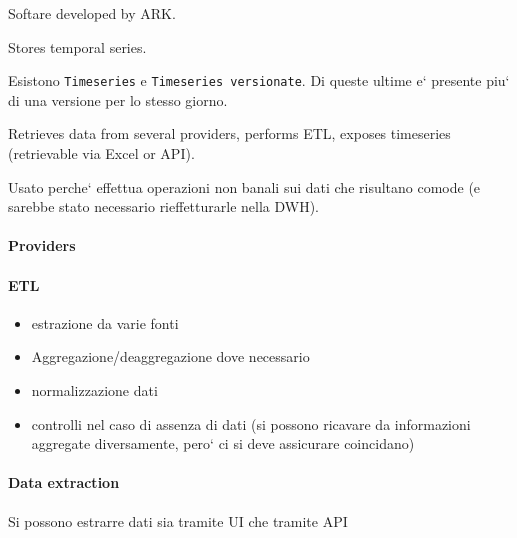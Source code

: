 Softare developed by ARK. \cite{bib:artesian:url}

Stores temporal series.

Esistono \texttt{Timeseries} e \texttt{Timeseries versionate}. Di queste ultime e` presente piu` di una versione per lo stesso giorno.

Retrieves data from several providers, performs ETL, exposes timeseries (retrievable via Excel or API).

Usato perche` effettua operazioni non banali sui dati che risultano comode (e sarebbe stato necessario rieffetturarle nella DWH).

\paragraph{Providers}
    

\paragraph{ETL}
    \begin{itemize}
        \item estrazione da varie fonti
        \item Aggregazione/deaggregazione dove necessario
        \item normalizzazione dati
        \item controlli nel caso di assenza di dati (si possono ricavare da informazioni aggregate diversamente, pero` ci si deve assicurare coincidano)
    \end{itemize}
    
\paragraph{Data extraction}
    Si possono estrarre dati sia tramite UI che tramite API
    
